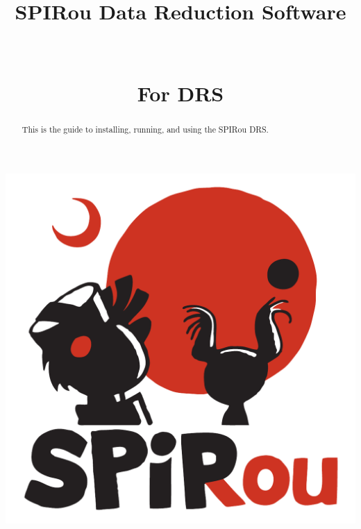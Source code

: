 \documentclass[
a4paper, %
10pt, %
onecolumn, %
openany, %
]{memoir}
\author{\MyAuthors}
\title{{\Huge SPIRou Data Reduction Software} \vspace{1cm} \\ \HUGE{User Guide} \\ {\small \MyVersionUser} \\ For DRS \instrument \MyCodeVersion}
\date{\MyDateUser}
\begin{document}
\frontmatter

\maketitle

\vspace{1cm}
\begin{center}
\includegraphics[width=.5\textwidth]{Figures/Logo_SPIRou-22.pdf}
\end{center}
\vspace{1cm}

\begin{abstract}
\noindent This is the guide to installing, running, and using the SPIRou DRS. 
\end{abstract}
\clearpage

\tableofcontents*
\clearpage


\mainmatter















% 


\backmatter


% 
% 
\end{document}
